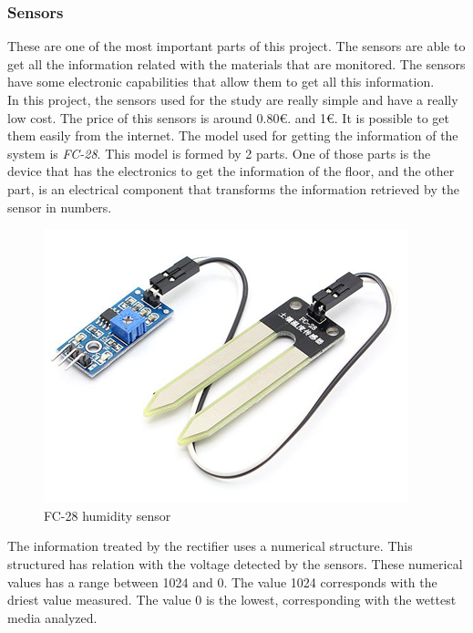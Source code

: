 \subsubsection{Sensors}

These are one of the most important parts of this project. The sensors are able to get all the information related with the materials that are monitored. The sensors have some electronic capabilities that allow them to get all this information.\\

In this project, the sensors used for the study are really simple and have a really low cost. The price of this sensors is around 0.80\euro . and 1\euro . It is possible to get them easily from the internet. The model used for getting the information of the system is \textit{FC-28}. This model is formed by 2 parts. One of those parts is the device that has the electronics to get the information of the floor, and the other part, is an electrical component that transforms the information retrieved by the sensor in numbers.\\

\begin{figure}[H]
\begin{centering}
\includegraphics[scale=0.8]{IMGS/FC-28.png}
\caption{FC-28 humidity sensor \label{FC28}}
\end{centering}
\end{figure}

The information treated by the rectifier uses a numerical structure. This structured has relation with the voltage detected by the sensors. These numerical values has a range between 1024 and 0. The value 1024 corresponds with the driest value measured. The value 0 is the lowest, corresponding with the wettest media analyzed.\\

